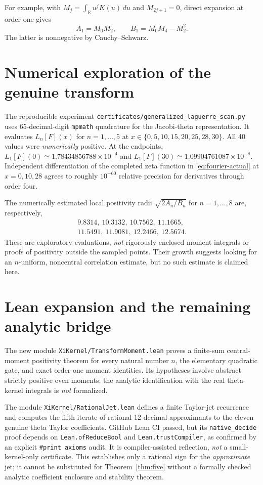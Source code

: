 For example, with $M_j=\int_{\mathbb R}u^j K(u)\,du$
and $M_{2j+1}=0$, direct expansion at order one gives
\begin{equation}\label{eq:n1moments}
A_1=M_0M_2,\qquad B_1=M_0M_4-M_2^2.
\end{equation}
The latter is nonnegative by Cauchy--Schwarz.

\section{Numerical exploration of the genuine transform}
The reproducible experiment
\texttt{certificates/generalized\_laguerre\_scan.py}
uses 65-decimal-digit \texttt{mpmath} quadrature for the
Jacobi-theta representation. It evaluates
$L_n[F](x)$ for $n=1,\ldots,5$ at
$x\in\{0,5,10,15,20,25,28,30\}$.
All 40 values were \emph{numerically} positive.
At the endpoints, $L_1[F](0)\simeq
1.78434856788\times 10^{-4}$ and
$L_1[F](30)\simeq 1.09904761087\times10^{-8}$.
Independent differentiation of the completed zeta function
in \eqref{eq:fourier-actual} at $x=0,10,28$ agrees to roughly
$10^{-60}$ relative precision for derivatives through order four.

The numerically estimated local positivity radii
$\sqrt{2A_n/B_n}$ for $n=1,\ldots,8$ are, respectively,
\[
\begin{gathered}
9.8314,\ 10.3132,\ 10.7562,\ 11.1665,\\
11.5491,\ 11.9081,\ 12.2466,\ 12.5674.
\end{gathered}
\]
These are exploratory evaluations, \emph{not} rigorously
enclosed moment integrals or proofs of positivity outside
the sampled points. Their growth suggests looking for
an $n$-uniform, noncentral correlation estimate, but no
such estimate is claimed here.

\section{Lean expansion and the remaining analytic bridge}
The new module \texttt{XiKernel/TransformMoment.lean}
proves a finite-sum central-moment positivity theorem for
every natural number $n$, the elementary quadratic gate,
and exact order-one moment identities. Its hypotheses
involve abstract strictly positive even moments;
the analytic identification with the real theta-kernel
integrals is \emph{not} formalized.

The module \texttt{XiKernel/RationalJet.lean}
defines a finite Taylor-jet recurrence and computes the
fifth iterate of rational 12-decimal approximants to the
eleven genuine theta Taylor coefficients. GitHub Lean CI
passed, but its \texttt{native\_decide} proof depends on
\texttt{Lean.ofReduceBool} and \texttt{Lean.trustCompiler},
as confirmed by an explicit \texttt{\#print axioms} audit.
It is compiler-assisted reflection, \emph{not} a small-kernel-only
certificate. This establishes only a rational sign for the
\emph{approximate} jet; it cannot be substituted for
Theorem~\ref{thm:five} without a formally checked
analytic coefficient enclosure and stability theorem.

